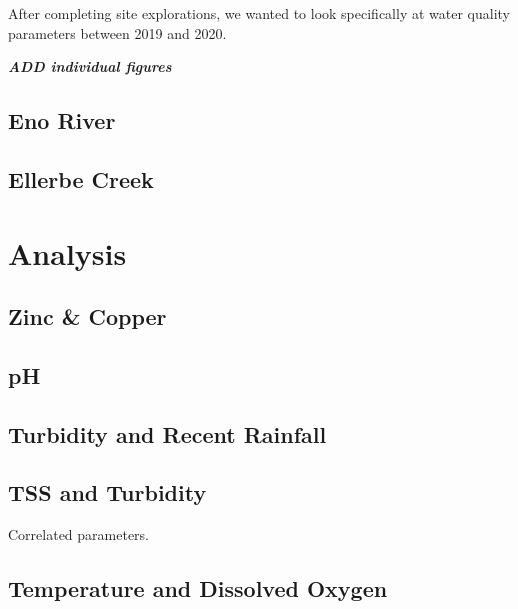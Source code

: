 \documentclass[
  12pt,
]{article}
\begin{document}
After completing site explorations, we wanted to look specifically at
water quality parameters between 2019 and 2020.

\textbf{\emph{ADD individual figures}}

\hypertarget{eno-river-1}{%
\subsection{Eno River}\label{eno-river-1}}

\hypertarget{ellerbe-creek-1}{%
\subsection{Ellerbe Creek}\label{ellerbe-creek-1}}

\newpage

\hypertarget{analysis}{%
\section{Analysis}\label{analysis}}

\hypertarget{zinc-copper}{%
\subsection{Zinc \& Copper}\label{zinc-copper}}

\hypertarget{ph}{%
\subsection{pH}\label{ph}}

\hypertarget{turbidity-and-recent-rainfall}{%
\subsection{Turbidity and Recent
Rainfall}\label{turbidity-and-recent-rainfall}}

\hypertarget{tss-and-turbidity}{%
\subsection{TSS and Turbidity}\label{tss-and-turbidity}}

Correlated parameters.

\hypertarget{temperature-and-dissolved-oxygen}{%
\subsection{Temperature and Dissolved
Oxygen}\label{temperature-and-dissolved-oxygen}}
\end{document}
